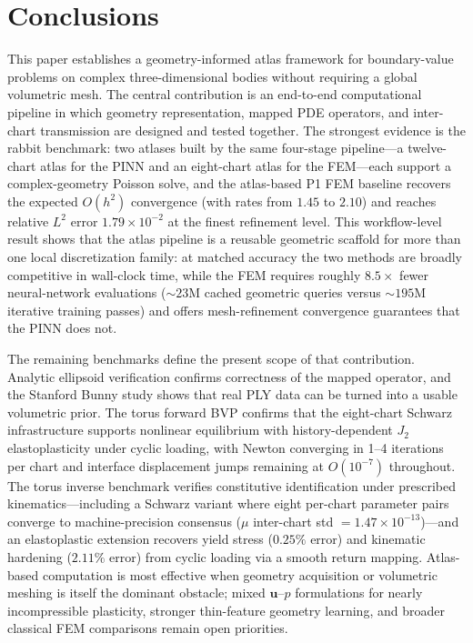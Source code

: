 \documentclass[sort&compress]{svjour3} %
\begin{document}
\section{Conclusions} \label{sec:conclusions}
This paper establishes a geometry-informed atlas framework for boundary-value problems on complex three-dimensional bodies without requiring a global volumetric mesh. The central contribution is an end-to-end computational pipeline in which geometry representation, mapped PDE operators, and inter-chart transmission are designed and tested together. The strongest evidence is the rabbit benchmark: two atlases built by the same four-stage pipeline---a twelve-chart atlas for the PINN and an eight-chart atlas for the FEM---each support a complex-geometry Poisson solve, and the atlas-based P1 FEM baseline recovers the expected $O(h^2)$ convergence (with rates from $1.45$ to $2.10$) and reaches relative $L^2$ error $1.79\times10^{-2}$ at the finest refinement level. This workflow-level result shows that the atlas pipeline is a reusable geometric scaffold for more than one local discretization family: at matched accuracy the two methods are broadly competitive in wall-clock time, while the FEM requires roughly $8.5\times$ fewer neural-network evaluations (${\sim}23$M cached geometric queries versus ${\sim}195$M iterative training passes) and offers mesh-refinement convergence guarantees that the PINN does not.

The remaining benchmarks define the present scope of that contribution. Analytic ellipsoid verification confirms correctness of the mapped operator, and the Stanford Bunny study shows that real PLY data can be turned into a usable volumetric prior. The torus forward BVP confirms that the eight-chart Schwarz infrastructure supports nonlinear equilibrium with history-dependent $J_2$ elastoplasticity under cyclic loading, with Newton converging in 1--4 iterations per chart and interface displacement jumps remaining at $O(10^{-7})$ throughout. The torus inverse benchmark verifies constitutive identification under prescribed kinematics---including a Schwarz variant where eight per-chart parameter pairs converge to machine-precision consensus ($\mu$ inter-chart std $= 1.47\times10^{-13}$)---and an elastoplastic extension recovers yield stress ($0.25\%$ error) and kinematic hardening ($2.11\%$ error) from cyclic loading via a smooth return mapping. Atlas-based computation is most effective when geometry acquisition or volumetric meshing is itself the dominant obstacle; mixed $\mathbf{u}$--$p$ formulations for nearly incompressible plasticity, stronger thin-feature geometry learning, and broader classical FEM comparisons remain open priorities.
\end{document}
